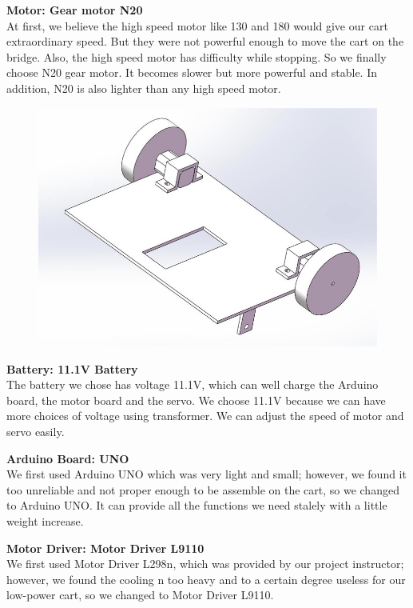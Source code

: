 \bigskip
\noindent
\textbf{Motor: Gear motor N20 } \\
\indent
At first, we believe the high speed motor like 130 and 180 would give our cart
extraordinary speed.
But they were not powerful enough to move the cart on the bridge.
Also, the high speed motor has difficulty while stopping.
So we finally choose N20 gear motor.
It becomes slower but more powerful and stable.
In addition, N20 is also lighter than any high speed motor.  \\
\begin{figure}[H]
\begin{center}
\includegraphics[width=15cm]{figure/designOverview/p1}
\end{center}
\end{figure}

\bigskip
\noindent
\textbf{Battery: 11.1V Battery } \\
\indent
The battery we chose has voltage 11.1V, which can well charge the Arduino board,
the motor board and the servo.
We choose 11.1V because we can have more choices of voltage using transformer.
We can adjust the speed of motor and servo easily.  

\bigskip
\noindent
\textbf{Arduino Board: UNO } \\
\indent
We first used Arduino UNO which was very light and small; however, we found it
too unreliable and not proper enough to be assemble on the cart, so we changed
to Arduino UNO.
It can provide all the functions we need stalely with a little weight increase.

\bigskip
\noindent
\textbf{Motor Driver: Motor Driver L9110 } \\
\indent
We first used Motor Driver L298n, which was provided by our project instructor;
however, we found the cooling n too heavy and to a certain degree useless for
our low-power cart, so we changed to Motor Driver L9110.

